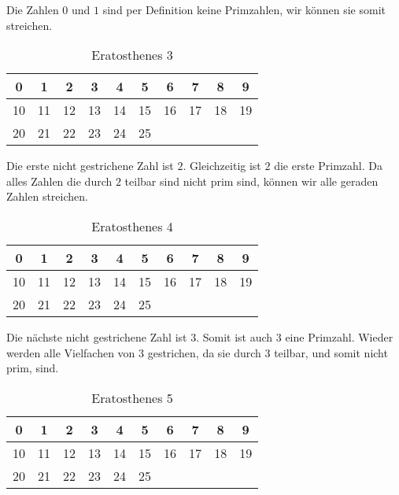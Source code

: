 	Die Zahlen $0$ und $1$ sind per Definition keine Primzahlen, wir können sie somit streichen.	 	
	
	\begin{table}[!ht] 
		\centering
		\begin{tabular}{|c|c|c|c|c|c|c|c|c|c|}
			\hline
			\cellcolor{red}0  & \cellcolor{red} 1 &  2 &  3 &  \cellcolor{red}4 &  5 & \cellcolor{red} 6 &  7 & \cellcolor{red} 8 &  9 \\
			\hline
			\cellcolor{red}10 & 11 & \cellcolor{red}12 & 13 & \cellcolor{red}14 & 15 & \cellcolor{red}16 & 17 & \cellcolor{red}18 & 19 \\
			\hline
			\cellcolor{red}20 & 21 & \cellcolor{red}22 & 23 & \cellcolor{red}24 & 25 & \ & \ & \ & \ \\
			\hline
		\end{tabular}
		\caption{Eratosthenes 3}
		\label{tab:eratosthenes3}
	\end{table}
	
	Die erste nicht gestrichene Zahl ist $2$. Gleichzeitig ist $2$ die erste Primzahl. Da alles Zahlen die durch $2$ teilbar sind nicht prim sind, können wir alle geraden Zahlen streichen. 
	
	\begin{table}[!ht] 
		\centering
		\begin{tabular}{|c|c|c|c|c|c|c|c|c|c|}
			\hline	 		 			
			\cellcolor{red}0  & \cellcolor{red} 1 &  2 &  3 & \cellcolor{red}4 &  5 & \cellcolor{red} 6 &  7 & \cellcolor{red} 8 &  \cellcolor{red}9 \\
			\hline
			\cellcolor{red}10 & 11 & \cellcolor{red}12 & 13 & \cellcolor{red}14 & \cellcolor{red}15 & \cellcolor{red}16 & 17 & \cellcolor{red}18 & 19 \\
			\hline
			\cellcolor{red}20 & \cellcolor{red}21 & \cellcolor{red}22 & 23 & \cellcolor{red}24 & 25 &  &  &  &  \\
			\hline
		\end{tabular}
		\caption{Eratosthenes 4}
		\label{tab:eratosthenes4}
	\end{table}
	
	Die n\"achste nicht gestrichene Zahl ist $3$. Somit ist auch $3$ eine Primzahl. Wieder werden alle Vielfachen von $3$ gestrichen, da sie durch $3$ teilbar, und somit nicht prim, sind.
	
	\begin{table}[!ht] 
		\centering
		\begin{tabular}{|c|c|c|c|c|c|c|c|c|c|}
			\hline	 		 			
			\cellcolor{red}0  & \cellcolor{red} 1 &  2 &  3 & \cellcolor{red}4 &  5 & \cellcolor{red} 6 &  7 & \cellcolor{red} 8 &  \cellcolor{red}9 \\
			\hline
			\cellcolor{red}10 & 11 & \cellcolor{red}12 & 13 & \cellcolor{red}14 & \cellcolor{red}15 & \cellcolor{red}16 & 17 & \cellcolor{red}18 & 19 \\
			\hline
			\cellcolor{red}20 & \cellcolor{red}21 & \cellcolor{red}22 & 23 & \cellcolor{red}24 & \cellcolor{red}25 &  &  & &  \\
			\hline
		\end{tabular}
		\caption{Eratosthenes 5}
		\label{tab:eratosthenes5}
	\end{table}	
	
